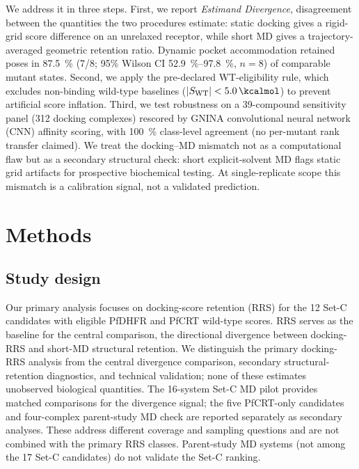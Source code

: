 \documentclass[journal=jcisd8,manuscript=article,layout=traditional]{achemso}
\begin{document}
We address it in three steps. First, we report \emph{Estimand Divergence}, disagreement between the quantities the two procedures estimate\citep{lundberg2021estimand}: static docking gives a rigid-grid score difference on an unrelaxed receptor, while short MD gives a trajectory-averaged geometric retention ratio. Dynamic pocket accommodation retained poses in \qty{87.5}{\percent} (7/8; 95\% Wilson CI \qtyrange{52.9}{97.8}{\percent}, $n=\num{8}$) of comparable mutant states. Second, we apply the pre-declared WT-eligibility rule, which excludes non-binding wild-type baselines ($|S_{\mathrm{WT}}| < \qty{5.0}{\kcalmol}$) to prevent artificial score inflation. Third, we test robustness on a 39-compound sensitivity panel (\num{312} docking complexes) rescored by GNINA convolutional neural network (CNN) affinity scoring, with \qty{100}{\percent} class-level agreement (no per-mutant rank transfer claimed). We treat the docking--MD mismatch not as a computational flaw but as a secondary structural check: short explicit-solvent MD flags static grid artifacts for prospective biochemical testing. At single-replicate scope this mismatch is a calibration signal, not a validated prediction.


\section{Methods}

\subsection{Study design}

Our primary analysis focuses on docking-score retention (RRS) for the 12 Set-C candidates with eligible PfDHFR and PfCRT wild-type scores. RRS serves as the baseline for the central comparison, the directional divergence between docking-RRS and short-MD structural retention. We distinguish the primary docking-RRS analysis from the central divergence comparison, secondary structural-retention diagnostics, and technical validation; none of these estimates unobserved biological quantities. The 16-system Set-C MD pilot provides matched comparisons for the divergence signal; the five PfCRT-only candidates and four-complex parent-study MD check are reported separately as secondary analyses. These address different coverage and sampling questions and are not combined with the primary RRS classes. Parent-study MD systems (not among the 17 Set-C candidates) do not validate the Set-C ranking.
\end{document}
